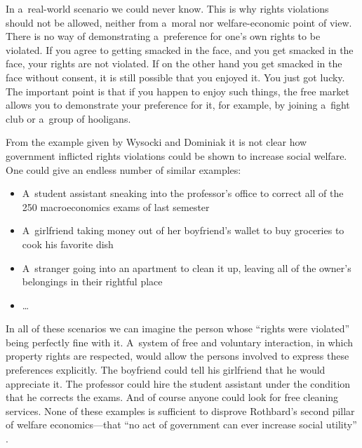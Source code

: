 In a~real-world scenario we could never know. This is why rights violations should not be allowed, neither from a~moral nor welfare-economic point of view. There is no way of demonstrating a~preference for one's own rights to be violated. If you agree to getting smacked in the face, and you get smacked in the face, your rights are not violated. If on the other hand you get smacked in the face without consent, it is still possible that you enjoyed it. You just got lucky. The important point is that if you happen to enjoy such things, the free market allows you to demonstrate your preference for it, for example, by joining a~fight club or a~group of hooligans.



From the example given by Wysocki and Dominiak 
\parencite*[][]{wysocki_how_2023} %
 it is not clear how government inflicted rights violations could be shown to increase social welfare. One could give an endless number of similar examples:



\begin{itemize}

\item A~student assistant sneaking into the professor's office to correct all of the 250 macroeconomics exams of last semester

\item A~girlfriend taking money out of her boyfriend's wallet to buy groceries to cook his favorite dish

\item A~stranger going into an apartment to clean it up, leaving all of the owner's belongings in their rightful place

\item …

\end{itemize}

In all of these scenarios we can imagine the person whose ``rights were violated'' being perfectly fine with it. A~system of free and voluntary interaction, in which property rights are respected, would allow the persons involved to express these preferences explicitly. The boyfriend could tell his girlfriend that he would appreciate it. The professor could hire the student assistant under the condition that he corrects the exams. And of course anyone could look for free cleaning services. None of these examples is sufficient to disprove Rothbard's second pillar of welfare economics---that ``no act of government can ever increase social utility'' 
\parencite[][p.323]{rothbard_toward_2011}.%




